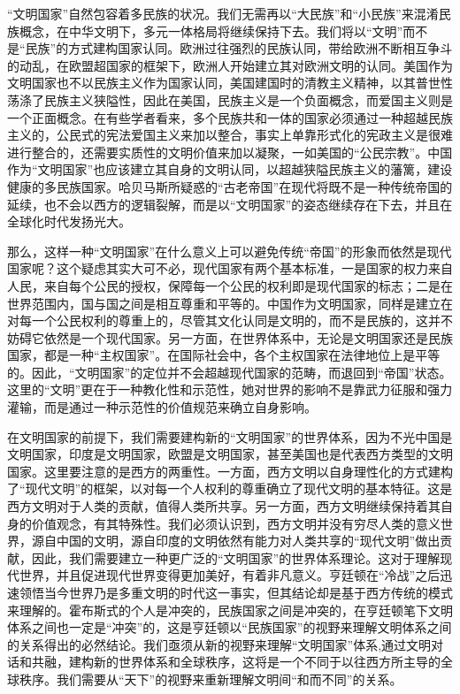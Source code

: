 \documentclass[UTF8, 12pt, a4paper]{ctexrep}
\begin{document}
“文明国家”自然包容着多民族的状况。我们无需再以“大民族”和“小民族”来混淆民族概念，在中华文明下，多元一体格局将继续保持下去。我们将以“文明”而不是“民族”的方式建构国家认同。欧洲过往强烈的民族认同，带给欧洲不断相互争斗的动乱，在欧盟超国家的框架下，欧洲人开始建立其对欧洲文明的认同。美国作为文明国家也不以民族主义作为国家认同，美国建国时的清教主义精神，以其普世性荡涤了民族主义狭隘性，因此在美国，民族主义是一个负面概念，而爱国主义则是一个正面概念。在有些学者看来，多个民族共和一体的国家必须通过一种超越民族主义的，公民式的宪法爱国主义来加以整合，事实上单靠形式化的宪政主义是很难进行整合的，还需要实质性的文明价值来加以凝聚，一如美国的“公民宗教”。中国作为“文明国家”也应该建立其自身的文明认同，以超越狭隘民族主义的藩篱，建设健康的多民族国家。哈贝马斯所疑惑的“古老帝国”在现代将既不是一种传统帝国的延续，也不会以西方的逻辑裂解，而是以“文明国家”的姿态继续存在下去，并且在全球化时代发扬光大。

那么，这样一种“文明国家”在什么意义上可以避免传统“帝国”的形象而依然是现代国家呢？这个疑虑其实大可不必，现代国家有两个基本标准，一是国家的权力来自人民，来自每个公民的授权，保障每一个公民的权利即是现代国家的标志；二是在世界范围内，国与国之间是相互尊重和平等的。中国作为文明国家，同样是建立在对每一个公民权利的尊重上的，尽管其文化认同是文明的，而不是民族的，这并不妨碍它依然是一个现代国家。另一方面，在世界体系中，无论是文明国家还是民族国家，都是一种“主权国家”。在国际社会中，各个主权国家在法律地位上是平等的。因此，“文明国家”的定位并不会超越现代国家的范畴，而退回到“帝国”状态。这里的“文明”更在于一种教化性和示范性，她对世界的影响不是靠武力征服和强力灌输，而是通过一种示范性的价值规范来确立自身影响。

在文明国家的前提下，我们需要建构新的“文明国家”的世界体系，因为不光中国是文明国家，印度是文明国家，欧盟是文明国家，甚至美国也是代表西方类型的文明国家。这里要注意的是西方的两重性。一方面，西方文明以自身理性化的方式建构了“现代文明”的框架，以对每一个人权利的尊重确立了现代文明的基本特征。这是西方文明对于人类的贡献，值得人类所共享。另一方面，西方文明继续保持着其自身的价值观念，有其特殊性。我们必须认识到，西方文明并没有穷尽人类的意义世界，源自中国的文明，源自印度的文明依然有能力对人类共享的“现代文明”做出贡献，因此，我们需要建立一种更广泛的“文明国家”的世界体系理论。这对于理解现代世界，并且促进现代世界变得更加美好，有着非凡意义。亨廷顿在“冷战”之后迅速领悟当今世界乃是多重文明的时代这一事实，但其结论却是基于西方传统的模式来理解的。霍布斯式的个人是冲突的，民族国家之间是冲突的，在亨廷顿笔下文明体系之间也一定是“冲突”的，这是亨廷顿以“民族国家”的视野来理解文明体系之间的关系得出的必然结论。我们亟须从新的视野来理解“文明国家”体系,通过文明对话和共融，建构新的世界体系和全球秩序，这将是一个不同于以往西方所主导的全球秩序。我们需要从“天下”的视野来重新理解文明间“和而不同”的关系。
\end{document}
